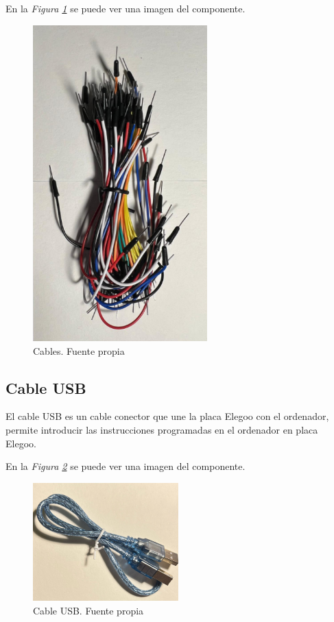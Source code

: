 En la \textit{Figura \ref{fig:cable_dupont}} se puede ver una imagen del componente.
\begin{figure}[h]
        \centering
        \includegraphics[angle=90,width=0.6\textwidth]{img/cable_dupont.png}
        \caption{Cables. Fuente propia}
        \label{fig:cable_dupont}
    \end{figure}
   
\subsection{Cable USB}
El cable USB es un cable conector que une la placa Elegoo con el ordenador, permite introducir las instrucciones programadas en el ordenador en placa Elegoo. 

En la \textit{Figura \ref{fig:Cable USB}} se puede ver una imagen del componente.
\begin{figure}[h]
        \centering
        \includegraphics[width=0.5\textwidth]{img/cable usb.png}
        \caption{Cable USB. Fuente propia}
        \label{fig:Cable USB}
    \end{figure}
   

